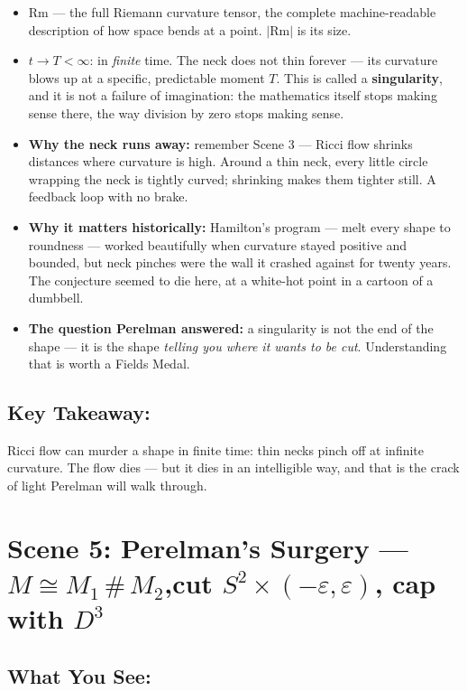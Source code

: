 \documentclass[11pt]{article}
\begin{document}
\begin{itemize}
  \item \textbf{\( \mathrm{Rm} \)} --- the full Riemann curvature tensor, the complete
  machine-readable description of how space bends at a point. $|\mathrm{Rm}|$ is its
  size.
  \item \textbf{\( t \to T < \infty \)}: in \emph{finite} time. The neck does not thin
  forever --- its curvature blows up at a specific, predictable moment $T$. This is
  called a \textbf{singularity}, and it is not a failure of imagination: the
  mathematics itself stops making sense there, the way division by zero stops making
  sense.
  \item \textbf{Why the neck runs away:} remember Scene 3 --- Ricci flow shrinks
  distances where curvature is high. Around a thin neck, every little circle wrapping
  the neck is tightly curved; shrinking makes them tighter still. A feedback loop with
  no brake.
  \item \textbf{Why it matters historically:} Hamilton's program --- melt every shape
  to roundness --- worked beautifully when curvature stayed positive and bounded, but
  neck pinches were the wall it crashed against for twenty years. The conjecture
  seemed to die here, at a white-hot point in a cartoon of a dumbbell.
  \item \textbf{The question Perelman answered:} a singularity is not the end of the
  shape --- it is the shape \emph{telling you where it wants to be cut}. Understanding
  that is worth a Fields Medal.
\end{itemize}

\subsection*{Key Takeaway:}

Ricci flow can murder a shape in finite time: thin necks pinch off at infinite
curvature. The flow dies --- but it dies in an intelligible way, and that is the crack
of light Perelman will walk through.

\hrulefill

\section*{Scene 5: Perelman's Surgery --- \( M \cong M_1 \,\#\, M_2 \),\quad cut $S^2 \times (-\varepsilon, \varepsilon)$, cap with $D^3$}

\subsection*{What You See:}
\end{document}
